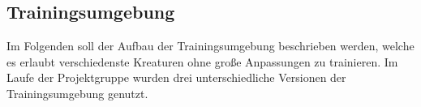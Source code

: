
%
%
%
%

\subsection{Trainingsumgebung}
Im Folgenden soll der Aufbau der Trainingsumgebung beschrieben werden, welche es erlaubt verschiedenste Kreaturen ohne große Anpassungen zu trainieren. Im Laufe der Projektgruppe wurden drei unterschiedliche Versionen der Trainingsumgebung genutzt. 

